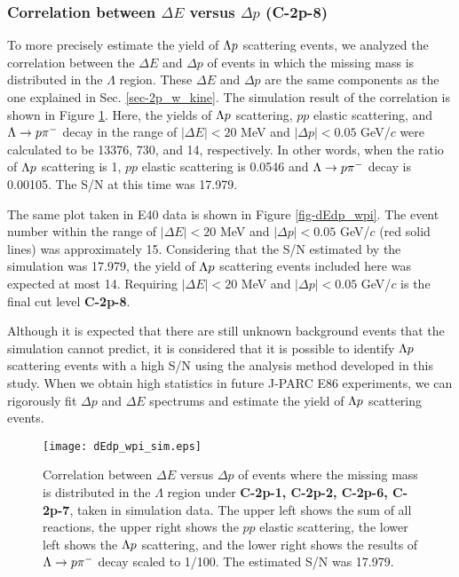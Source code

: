 \subsubsection{Correlation between $\Delta E$ versus $\Delta p$ ({\bf C-2p-8})}

To more precisely estimate the yield of $\Lambda p$ scattering events, we analyzed the correlation between the $\Delta E$ and $\Delta p$ of events in which the missing mass is distributed in the $\Lambda$ region.
These $\Delta E$ and $\Delta p$ are the same components as the one explained in Sec. \ref{sec-2p_w_kine}.
The simulation result of the correlation is shown in Figure \ref{fig-dEdp_wpi_sim}. Here, the yields of $\Lambda p$ scattering, $pp$ elastic scattering, and $\Lambda\to p\pi^{-}$ decay in the range of $|\Delta E|<20$ MeV and $|\Delta p|<0.05$ GeV/$c$ were calculated to be 13376, 730, and 14, respectively. In other words, when the ratio of $\Lambda p$ scattering is 1, $pp$ elastic scattering is 0.0546 and $\Lambda\to p\pi^{-}$ decay is 0.00105. The S/N at this time was 17.979.

The same plot taken in E40 data is shown in Figure \ref{fig-dEdp_wpi}. The event number within the range of $|\Delta E|<20$ MeV and $|\Delta p|<0.05$ GeV/$c$ (red solid lines) was approximately 15. Considering that the S/N estimated by the simulation was 17.979, the yield of $\Lambda p$ scattering events included here was expected at most 14. Requiring $|\Delta E|<20$ MeV and $|\Delta p|<0.05$ GeV/$c$ is the final cut level {\bf C-2p-8}.

Although it is expected that there are still unknown background events that the simulation cannot predict, it is considered that it is possible to identify $\Lambda p$ scattering events with a high S/N using the analysis method developed in this study. When we obtain high statistics in future J-PARC E86 experiments, we can rigorously fit $\Delta p$ and $\Delta E$ spectrums and estimate the yield of $\Lambda p$ scattering events. 

\begin{figure}[!h]
  \begin{center}
    \texttt{[image: dEdp\_wpi\_sim.eps]}
    \caption{Correlation between $\Delta E$ versus $\Delta p$ of events where the missing mass is distributed in the $\Lambda$ region under {\bf C-2p-1, C-2p-2, C-2p-6, C-2p-7}, taken in simulation data. The upper left shows the sum of all reactions, the upper right shows the $pp$ elastic scattering, the lower left shows the $\Lambda p$ scattering, and the lower right shows the results of $\Lambda\to p\pi^{-}$ decay scaled to 1/100. The estimated S/N was 17.979.}
    \label{fig-dEdp_wpi_sim}
  \end{center}
\end{figure}

